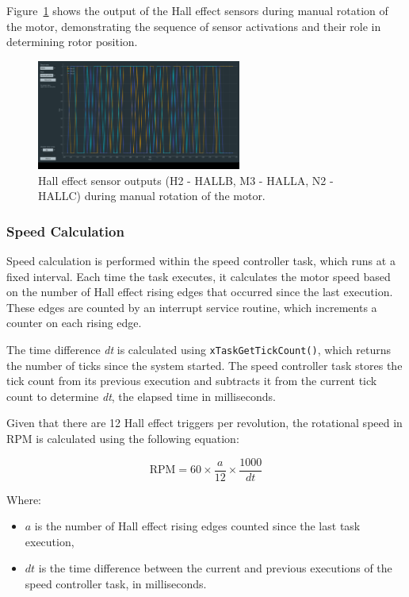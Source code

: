 \documentclass[a4paper, 11pt, titlepage]{article}
\begin{document}
Figure~\ref{fig:hall_sensors} shows the output of the Hall effect sensors during manual rotation of the motor, demonstrating the sequence of sensor activations and their role in determining rotor position.

\begin{figure}[h]
    \centering
    \includegraphics[width=0.6\textwidth]{images/hallEffectMadness.png}
    \caption{Hall effect sensor outputs (H2 - HALLB, M3 - HALLA, N2 - HALLC) during manual rotation of the motor.}
    \label{fig:hall_sensors}
\end{figure}

\subsubsection{Speed Calculation}
Speed calculation is performed within the speed controller task, which runs at a fixed interval. Each time the task executes, it calculates the motor speed based on the number of Hall effect rising edges that occurred since the last execution. These edges are counted by an interrupt service routine, which increments a counter on each rising edge.

The time difference \textit{dt} is calculated using \texttt{xTaskGetTickCount()}, which returns the number of ticks since the system started. The speed controller task stores the tick count from its previous execution and subtracts it from the current tick count to determine \textit{dt}, the elapsed time in milliseconds.

Given that there are 12 Hall effect triggers per revolution\parencite{motordata}, the rotational speed in RPM is calculated using the following equation:

\begin{equation}
    \text{RPM} = 60 \times \frac{a}{12} \times \frac{1000}{dt}
\end{equation}

Where:
\begin{itemize}
    \item $a$ is the number of Hall effect rising edges counted since the last task execution,
    \item $dt$ is the time difference between the current and previous executions of the speed controller task, in milliseconds.
\end{itemize}
\end{document}
